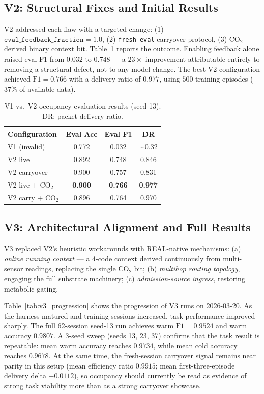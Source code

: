 \documentclass[10pt,twocolumn]{article}
\begin{document}
\subsection{V2: Structural Fixes and Initial Results}

V2 addressed each flaw with a targeted change:
(1) $\texttt{eval\_feedback\_fraction} = 1.0$,
(2) \texttt{fresh\_eval} carryover protocol,
(3) CO$_2$-derived binary context bit.
Table~\ref{tab:v2_results} reports the outcome.
Enabling feedback alone raised eval F1 from $0.032$ to $0.748$ --- a $23\times$
improvement attributable entirely to removing a structural defect, not to
any model change.
The best V2 configuration achieved $\mathrm{F1} = 0.766$ with a delivery
ratio of $0.977$, using $500$ training episodes ($37\%$ of available data).

\begin{table}[t]
\centering
\caption{V1 vs.\ V2 occupancy evaluation results (seed 13).
  DR: packet delivery ratio.}
\label{tab:v2_results}
\small
\begin{tabular}{lccc}
\toprule
Configuration & Eval Acc & Eval F1 & DR \\
\midrule
V1 (invalid)          & 0.772 & 0.032 & $\sim$0.32 \\
V2 live               & 0.892 & 0.748 & 0.846 \\
V2 carryover          & 0.900 & 0.757 & 0.831 \\
V2 live + CO$_2$      & \textbf{0.900} & \textbf{0.766} & \textbf{0.977} \\
V2 carry + CO$_2$     & 0.896 & 0.764 & 0.970 \\
\bottomrule
\end{tabular}
\end{table}

\subsection{V3: Architectural Alignment and Full Results}

V3 replaced V2's heuristic workarounds with REAL-native mechanisms:
(a) \emph{online running context} --- a 4-code context derived continuously
from multi-sensor readings, replacing the single CO$_2$ bit;
(b) \emph{multihop routing topology}, engaging the full substrate machinery;
(c) \emph{admission-source ingress}, restoring metabolic gating.

Table~\ref{tab:v3_progression} shows the progression of V3 runs on 2026-03-20.
As the harness matured and training sessions increased, task performance
improved sharply.
The full 62-session seed-13 run achieves warm $\mathrm{F1} = 0.9524$ and warm
accuracy $0.9807$.
A 3-seed sweep (seeds 13, 23, 37) confirms that the task result is repeatable:
mean warm accuracy reaches $0.9734$, while mean cold accuracy reaches $0.9678$.
At the same time, the fresh-session carryover signal remains near parity in
this setup (mean efficiency ratio $0.9915$; mean first-three-episode delivery
delta $-0.0112$), so occupancy should currently be read as evidence of strong
task viability more than as a strong carryover showcase.
\end{document}
